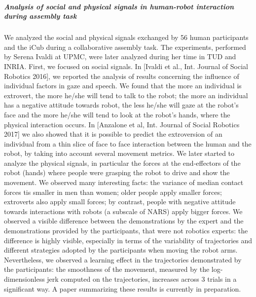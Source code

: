 \subparagraph*{Analysis of social and physical signals in human-robot interaction during assembly task}

We analyzed the social and physical signals exchanged by 56 human participants and the iCub during a collaborative assembly task. The experiments, performed by Serena Ivaldi at UPMC, were later analyzed during her time in TUD and INRIA.
First, we focused on social signals. In [Ivaldi et al., Int. Journal of Social Robotics 2016], we reported the analysis of results concerning the influence of individual factors in gaze and speech. We found that the more an individual is extrovert, the more he/she will tend to talk to the robot; the more an individual has a negative attitude towards robot, the less he/she will gaze at the robot’s face and the more he/she will tend to look at the robot’s hands, where the physical interaction occurs. In [Anzalone et al, Int. Journal of Social Robotics 2017] we also showed that it is possible to predict the extroversion of an individual from a thin slice of face to face interaction between the human and the robot, by taking into account several movement metrics.
We later started to analyze the physical signals, in particular the forces at the end-effectors of the robot (hands) where people were grasping the robot to drive and show the movement. We observed many interesting facts: the variance of median contact forces tis smaller in men than women; older people apply smaller forces; extroverts also apply small forces; by contrast, people with negative attitude towards interactions with robots (a subscale of NARS) apply bigger forces. We observed a visible difference between the demonstrations by the expert and the demonstrations provided by the participants, that were not robotics experts: the difference is highly visible, especially in terms of the variability of trajectories and different strategies adopted by the participants when moving the robot arms. Nevertheless, we observed a learning effect in the trajectories demonstrated by the participants: the smoothness of the movement, measured by the log-dimensionless jerk computed on the trajectories, increases across 3 trials in a significant way. A paper summarizing these results is currently in preparation.
